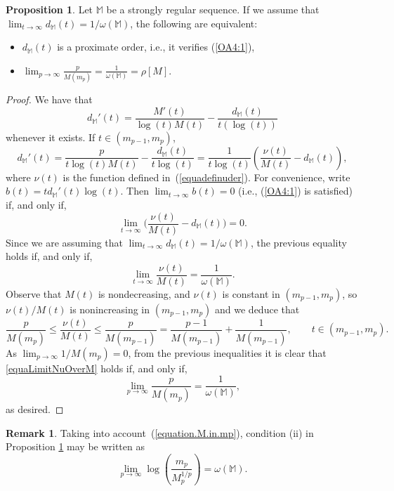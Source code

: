 \documentclass[11pt,a4paper]{article}
\theoremstyle{definition}
\newtheorem{pro}[theo]{Proposition}
\newtheorem{rema}[theo]{Remark}
\newenvironment{prop}{\smallskip\begin{pro}}{\end{pro}\smallskip}
\def\oo{\infty}
\def\ri{\rightarrow}
\def\o{\omega}
\def\ro{\rho}
\def\M{\mathbb{M}}
\begin{document}
\begin{prop}\label{propcaracdderordenaprox}
Let $\M$ be a strongly regular sequence. If we assume that $\lim_{t\ri\oo} d_{\M}(t)=1/\o(\M)$,
the following are equivalent:
\begin{itemize}
\item[(i)] $d_{\M}(t)$ is a proximate order, i.e., it verifies (\ref{OA4:1}),
\item[(ii)] $\displaystyle\lim_{p\to\infty}\frac{p}{M(m_{p})}=\frac{1}{\omega(\M)}=\ro[M]$.
\end{itemize}
\end{prop}

\begin{proof}
We have that
$$d_{\M}'(t)=\frac{M'(t)}{\log(t)M(t)}-\frac{d_{\M}(t)}{t (\log(t))}$$
whenever it exists. If $t\in(m_{p-1},m_p)$,
$$d_{\M}'(t)=\frac{p}{t\log(t) M(t)}-\frac{d_{\M}(t)}{t \log(t)}=
\frac{1}{t\log(t)}\left(\frac{\nu(t)}{M(t)}-d_{\M}(t)\right),$$
where $\nu(t)$ is the function defined in~(\ref{equadefinuder}). For convenience,
write $b(t)=td_{\M}'(t)\log(t)$. Then $\lim_{t\ri\oo} b(t)=0$ (i.e., (\ref{OA4:1})
is satisfied) if, and only if,
$$\lim_{t\ri \oo} \Big(\frac{\nu(t)}{M(t)} - d_{\M}(t)\Big)=0.$$
Since we are assuming that $\lim_{t\ri\oo} d_{\M}(t) = 1/\o(\M)$, the previous equality holds if, and only if,
\begin{equation}\label{equaLimitNuOverM}
\lim_{t\ri \oo} \frac{\nu(t)}{M(t)}= \frac{1}{\o(\M)}.
\end{equation}
Observe that $M(t)$ is nondecreasing, and $\nu(t)$ is constant in $(m_{p-1},m_p)$, so $\nu(t)/M(t)$ is nonincreasing in $(m_{p-1},m_p)$ and we deduce that
$$\frac{p}{M(m_p)}\leq\frac{\nu(t)}{M(t)}\leq \frac{p}{M(m_{p-1})} =\frac{p-1}{M(m_{p-1})} + \frac{1}{M(m_{p-1})}, \qquad t\in(m_{p-1},m_p).$$
As $\lim_{p\ri\oo} 1/M(m_p) =0$, from the previous inequalities it is clear that \eqref{equaLimitNuOverM} holds if, and only if,
$$\lim_{p\ri \oo} \frac{p}{M(m_p)}= \frac{1}{\o(\M)},$$
as desired.
\end{proof}

\begin{rema}
Taking into account~(\ref{equation.M.in.mp}), condition (ii) in Proposition \ref{propcaracdderordenaprox} may be written as
 \begin{equation}\label{limit.beta.infinity.omega}
  \lim_{p\ri\oo} \log\left(\frac{m_p}{M_p^{1/p}}\right)=\o(\M).
 \end{equation}
\end{rema}
\end{document}
